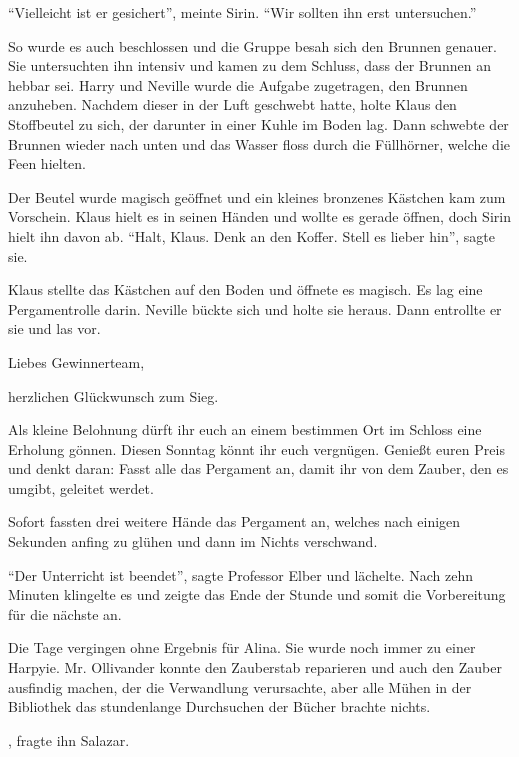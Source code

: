 \enquote{Vielleicht ist er gesichert}, meinte Sirin. \enquote{Wir sollten ihn erst untersuchen.}

So wurde es auch beschlossen und die Gruppe besah sich den Brunnen genauer. Sie untersuchten ihn intensiv und kamen zu dem Schluss, dass der Brunnen an hebbar sei. Harry und Neville wurde die Aufgabe zugetragen, den Brunnen anzuheben. Nachdem dieser in der Luft geschwebt hatte, holte Klaus den Stoffbeutel zu sich, der darunter in einer Kuhle im Boden lag. Dann schwebte der Brunnen wieder nach unten und das Wasser floss durch die Füllhörner, welche die Feen hielten.

Der Beutel wurde magisch geöffnet und ein kleines bronzenes Kästchen kam zum Vorschein. Klaus hielt es in seinen Händen und wollte es gerade öffnen, doch Sirin hielt ihn davon ab. \enquote{Halt, Klaus. Denk an den Koffer. Stell es lieber hin}, sagte sie.

Klaus stellte das Kästchen auf den Boden und öffnete es magisch. Es lag eine Pergamentrolle darin. Neville bückte sich und holte sie heraus. Dann entrollte er sie und las vor.

\begin{brief}
Liebes Gewinnerteam,

herzlichen Glückwunsch zum Sieg.

Als kleine Belohnung dürft ihr euch an einem bestimmen Ort im Schloss eine Erholung gönnen. Diesen Sonntag könnt ihr euch vergnügen. Genießt euren Preis und denkt daran: Fasst alle das Pergament an, damit ihr von dem Zauber, den es umgibt, geleitet werdet.
\end{brief}

Sofort fassten drei weitere Hände das Pergament an, welches nach einigen Sekunden anfing zu glühen und dann im Nichts verschwand.

\enquote{Der Unterricht ist beendet}, sagte Professor Elber und lächelte. Nach zehn Minuten klingelte es und zeigte das Ende der Stunde und somit die Vorbereitung für die nächste an.

\trenn

Die Tage vergingen ohne Ergebnis für Alina. Sie wurde noch immer zu einer Harpyie. Mr. Ollivander konnte den Zauberstab reparieren und auch den Zauber ausfindig machen, der die Verwandlung verursachte, aber alle Mühen in der Bibliothek \gst das stundenlange Durchsuchen der Bücher \gst brachte nichts.

, fragte ihn Salazar.

